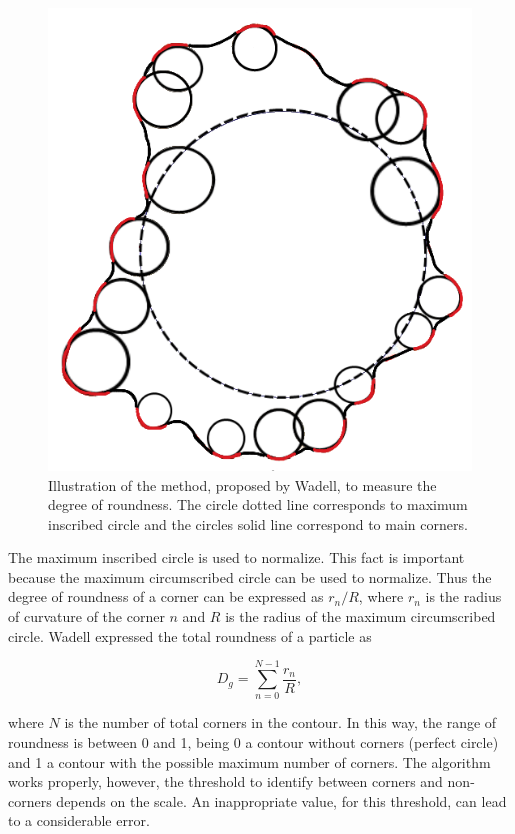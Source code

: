 \documentclass[conference]{IEEEtran}
\begin{document}
\begin{figure}[htbp]
\centerline{\includegraphics[scale=0.4]{fig2.png}}
\caption{Illustration of the method, proposed by Wadell, to measure the degree of roundness. The circle dotted line corresponds to maximum inscribed circle and the circles solid line correspond to main corners.}
\label{fig2}
\end{figure}

The maximum inscribed circle is used to normalize. This fact is important because the maximum circumscribed circle can be used to normalize.  Thus the degree of roundness of a corner can be expressed as $r_{n}/R$, where $r_{n}$ is the radius of curvature of the corner $n$ and $R$ is the radius of the maximum circumscribed circle. Wadell \cite{b6} expressed the total roundness of a particle as

\begin{equation}
D_{g} = \sum_{n=0}^{N-1}{ \frac{r_{n}}{R}}, \label{eq1}
\end{equation}

\noindent where $ N $ is the number of total corners in the contour. In this way, the range of roundness is between 0 and 1, being 0 a contour without corners (perfect circle) and 1 a contour with the possible maximum number of corners. The algorithm works properly, however, the threshold to identify between corners and non-corners depends on the scale. An inappropriate value, for this threshold, can lead to a considerable error.
\end{document}
